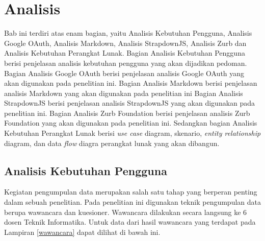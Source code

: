 \chapter{Analisis}
\label{chap:analisis}

Bab ini terdiri atas enam bagian, yaitu Analisis Kebutuhan Pengguna, Analisis Google OAuth, Analisis Markdown, Analisis StrapdownJS, Analisis Zurb dan Analisis Kebutuhan Perangkat Lunak. Bagian Analisis Kebutuhan Pengguna berisi penjelasan analisis kebutuhan pengguna yang akan dijadikan pedoman. Bagian Analisis Google OAuth berisi penjelasan analisis Google OAuth yang akan digunakan pada penelitian ini. Bagian Analisis Markdown berisi penjelasan analisis Markdown yang akan digunakan pada penelitian ini Bagian Analisis StrapdownJS berisi penjelasan analisis StrapdownJS yang akan digunakan pada penelitian ini. Bagian Analisis Zurb Foundation berisi penjelasan analisis Zurb Foundation yang akan digunakan pada penelitian ini. Sedangkan bagian Analisis Kebutuhan Perangkat Lunak berisi {\it use case} diagram, skenario, {\it entity relationship} diagram, dan data {\it flow} diagra perangkat lunak yang akan dibangun.

\section{Analisis Kebutuhan Pengguna}
\label{sec:analisiskebutuhanpengguna}
Kegiatan pengumpulan data merupakan salah satu tahap yang berperan penting dalam sebuah penelitian. Pada penelitian ini digunakan teknik pengumpulan data berupa wawancara dan kuesioner. Wawancara dilakukan secara langsung ke 6 dosen Teknik Informatika. Untuk data dari hasil wawancara yang terdapat pada Lampiran \ref{wawancara} dapat dilihat di bawah ini.

